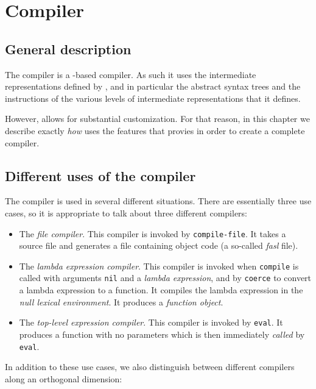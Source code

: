 \chapter{Compiler}
\label{chap-compiler}

\section{General description}

The \sysname{} compiler is a \cleavir{}-based compiler.  As such it uses
the intermediate representations defined by \cleavir{}, and in
particular the abstract syntax trees and the instructions of the
various levels of intermediate representations that it defines.

However, \cleavir{} allows for substantial customization.  For that
reason, in this chapter we describe exactly \emph{how} \sysname{} uses
the features that \cleavir{} provies in order to create a complete
compiler.

\section{Different uses of the compiler}

The compiler is used in several different situations.  There are
essentially three use cases, so it is appropriate to talk about three
different compilers:

\begin{itemize}
\item The \emph{file compiler}.  This compiler is invoked by
  \texttt{compile-file}.  It takes a \commonlisp{} source file and generates a
  file containing object code (a so-called \emph{fasl} file).
\item The \emph{lambda expression compiler}.  This compiler is invoked
  when \texttt{compile} is called with arguments \texttt{nil} and a
  \emph{lambda expression}, and by \texttt{coerce} to convert a lambda
  expression to a function.  It compiles the lambda expression in the
  \emph{null lexical environment}.  It produces a \emph{function
    object}.
\item The \emph{top-level expression compiler}.  This compiler is
  invoked by \texttt{eval}.  It produces a function with no parameters
  which is then immediately \emph{called} by \texttt{eval}.
\end{itemize}

In addition to these use cases, we also distinguish between different
compilers along an orthogonal dimension:

